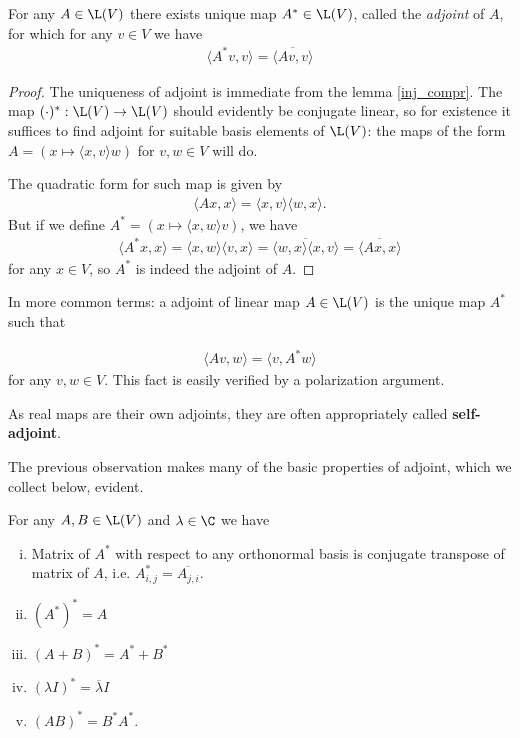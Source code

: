 \begin{lause}
	For any $A \in \L(V)$ there exists unique map $A^{*} \in \L(V)$, called the \textit{adjoint} of $A$, for which for any $v \in V$ we have
	\begin{align*}
	\langle A^{*} v, v\rangle = \overline{\langle A v, v \rangle}
	\end{align*}
\end{lause}
\begin{proof}
	The uniqueness of adjoint is immediate from the lemma \ref{inj_compr}. The map $(\cdot)^{*} : \L(V) \to \L(V)$ should evidently be conjugate linear, so for existence it suffices to find adjoint for suitable basis elements of $\L(V)$: the maps of the form $A = (x \mapsto \langle x, v \rangle w)$ for $v, w \in V$ will do.

	The quadratic form for such map is given by
	\begin{align*}
		\langle A x, x \rangle = \langle x, v \rangle \langle w, x \rangle.
	\end{align*}
	But if we define $A^{*} = (x \mapsto \langle x, w \rangle v)$, we have
	\begin{align*}
		\langle A^{*} x, x \rangle = \langle x, w \rangle \langle v, x \rangle = \overline{\langle w, x \rangle \langle x, v \rangle} = \overline{\langle A x, x \rangle}
	\end{align*}
	for any $x \in V$, so $A^{*}$ is indeed the adjoint of $A$.
\end{proof}

In more common terms: a adjoint of linear map $A \in \L(V)$ is the unique map $A^{*}$ such that

\begin{align}\label{adjoint_common}
	\langle A v, w \rangle = \langle v, A^{*} w \rangle
\end{align}
for any $v, w \in V$. This fact is easily verified by a polarization argument.

As real maps are their own adjoints, they are often appropriately called \textbf{self-adjoint}.

The previous observation makes many of the basic properties of adjoint, which we collect below, evident.

\begin{lause}\label{basic_adjoint}
	For any $A, B \in \L(V)$ and $\lambda \in \C$ we have
	\begin{enumerate}[i)]
		\item Matrix of $A^{*}$ with respect to any orthonormal basis is conjugate transpose of matrix of $A$, i.e. $A^{*}_{i, j} = \overline{A_{j, i}}$.
		\item $(A^{*})^{*} = A$
		\item $(A + B)^{*} = A^{*} + B^{*}$
		\item $(\lambda I)^{*} = \overline{\lambda} I$
		\item $(AB)^{*} = B^{*}A^{*}$.
	\end{enumerate}
\end{lause}

